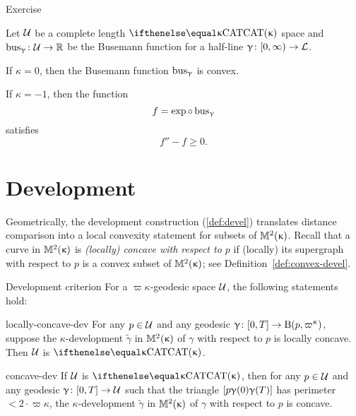 \begin{thm}{Exercise}\label{ex:busemann-CBA}{\sloppy 
Let $\mathcal{U}$ be a complete length $\CAT\kappa$ space
and $\bus_\gamma\:\spc{U}\to \RR$ be the Busemann function for a half-line $\gamma\:[0,\infty)\to \spc{L}$.

}

\begin{subthm}{}
If $\kappa=0$, then the Busemann function $\mathop{\rm bus}\nolimits_\upgamma$ is  convex.
\end{subthm}

\begin{subthm}{}
If $\kappa=-1$, then the function 
\[f=\exp\circ\bus_\gamma\] 
satisfies
\[f''- f\ge 0.\]
\end{subthm}

\end{thm}

\section{Development}\label{sec:development-CBA}
 
Geometrically,  the development construction (\ref{def:devel}) translates distance comparison into a local convexity statement for subsets of $\mathbb{M}_{{}}^{2}({\upkappa})$.
Recall that a curve in $\mathbb{M}_{{}}^{2}({\upkappa})$ is \emph{(locally) concave with respect to $p$} if (locally) its supergraph with respect to $p$ is a convex subset of $\mathbb{M}_{{}}^{2}({\upkappa})$; see Definition~\ref{def:convex-devel}.

\begin{thm}{Development criterion}\label{thm:concave-devel} 
For a $\varpi\kappa$-geodesic space $\mathcal{U}$,
the following statements hold:

\begin{subthm}{locally-concave-dev}
For any $p\in \spc{U}$ and any geodesic $\gamma\:[0,T]\to\oBall(p,\varpi\kappa)$, suppose the $\kappa$-development $\tilde \gamma$ in $\mathbb{M}_{{}}^{2}({\upkappa})$ of $\gamma$ with respect to $p$ is locally concave. 
Then $\mathcal{U}$ is $\CAT\kappa$.
\end{subthm}

\begin{subthm}{concave-dev} 
If $\mathcal{U}$ is $\CAT\kappa$, then for any $p\in \spc{U}$ and any geodesic $\gamma\:[0,T]\to\spc{U}$ 
such that the triangle $[{p}{\upgamma(0)}{\upgamma(T)}]$ has perimeter $<2\cdot\varpi\kappa$,
the $\kappa$-development $\tilde \gamma$ in $\mathbb{M}_{{}}^{2}({\upkappa})$ of $\gamma$ with respect to $p$ is concave. 
\end{subthm}

\end{thm}


